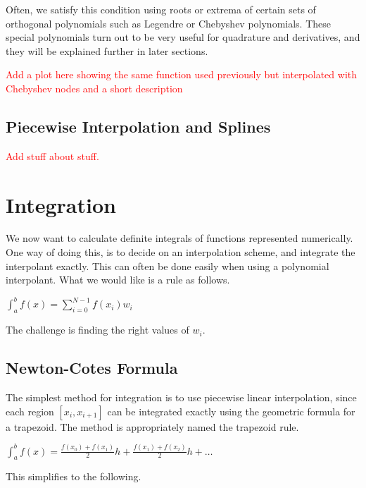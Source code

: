 \documentclass[12pt,letterpaper]{article}
\numberwithin{equation}{section}
\begin{document}
\indent Often, we satisfy this condition using roots or extrema of certain sets of orthogonal polynomials such as Legendre or Chebyshev polynomials. These special polynomials turn out to be very useful for quadrature and derivatives, and they will be explained further in later sections.

\begin{center}
\textcolor{red}{Add a plot here showing the same function used previously but interpolated with Chebyshev nodes and a short description}
\end{center}

\subsection{Piecewise Interpolation and Splines}
\begin{center}
\textcolor{red}{Add stuff about stuff.}
\end{center}

\newpage
\section{Integration}
We now want to calculate definite integrals of functions represented numerically. One way of doing this, is to decide on an interpolation scheme, and integrate the interpolant exactly. This can often be done easily when using a polynomial interpolant. What we would like is a rule as follows.

\begin{center}
$\int_{a}^{b}f(x) = \sum_{i=0}^{N-1}f(x_i)w_i$
\end{center}

The challenge is finding the right values of $w_i$.

\subsection{Newton-Cotes Formula}
The simplest method for integration is to use piecewise linear interpolation, since each region $[x_i,x_{i+1}]$ can be integrated exactly using the geometric formula for a trapezoid. The method is appropriately named the trapezoid rule.

\begin{center}
$\int_{a}^{b}f(x) = \frac{f(x_0)+f(x_1)}{2}h + \frac{f(x_1)+f(x_2)}{2}h + \dots$
\end{center}

\noindent This simplifies to the following.
\end{document}
